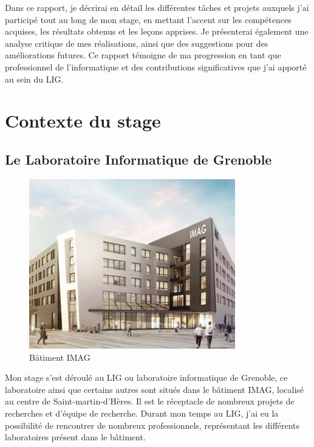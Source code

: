 \documentclass[a4paper,french,12pt, titlepage]{article}
\begin{document}
Dans ce rapport, je décrirai en détail les différentes tâches et projets
auxquels j'ai participé tout au long de mon stage, en mettant l'accent
sur les compétences acquises, les résultats obtenus et les leçons
apprises. Je présenterai également une analyse critique de mes
réalisations, ainsi que des suggestions pour des améliorations futures.
Ce rapport témoigne de ma progression en tant que professionnel de
l'informatique et des contributions significatives que j'ai apporté au
sein du LIG.

\newpage

\hypertarget{contexte-du-stage}{%
\section{Contexte du stage}\label{contexte-du-stage}}

\hypertarget{le-laboratoire-informatique-de-grenoble}{%
\subsection{Le Laboratoire Informatique de
Grenoble}\label{le-laboratoire-informatique-de-grenoble}}

\begin{figure}[h]
\centering
\includegraphics[width=0.8\textwidth,height=0.8\textheight,keepaspectratio]{images/imag.png}
\caption{Bâtiment IMAG}
\end{figure}

Mon stage s'est déroulé au LIG ou laboratoire informatique de Grenoble,
ce laboratoire ainsi que certains autres sont situés dans le bâtiment
IMAG, localisé au centre de Saint-martin-d'Hères. Il est le réceptacle
de nombreux projets de recherches et d'équipe de recherche. Durant mon
temps au LIG, j'ai eu la possibilité de rencontrer de nombreux
professionnels, représentant les différents laboratoires présent dans le
bâtiment.\newline
\end{document}

